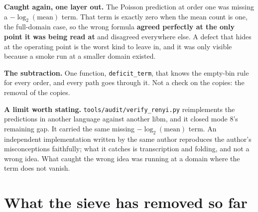 \textbf{Caught again, one layer out.} The Poisson prediction at order one was missing a \(-\log_2(\mathrm{mean})\) term. That term is exactly zero when the mean count is one, the full-domain case, so the wrong formula \textbf{agreed perfectly at the only point it was being read at} and disagreed everywhere else. A defect that hides at the operating point is the worst kind to leave in, and it was only visible because a smoke run at a smaller domain existed.

\textbf{The subtraction.} One function, \texttt{deficit\_term}, that knows the empty-bin rule for every order, and every path goes through it. Not a check on the copies: the removal of the copies.

\textbf{A limit worth stating.} \texttt{tools/\allowbreak{}audit/\allowbreak{}verify\_renyi.py} reimplements the predictions in another language against another libm, and it closed mode 8's remaining gap. It carried the same missing \(-\log_2(\mathrm{mean})\) term. An independent implementation written by the same author reproduces the author's misconceptions faithfully; what it catches is transcription and folding, and not a wrong idea. What caught the wrong idea was running at a domain where the term does not vanish.

\section{What the sieve has removed so far}

